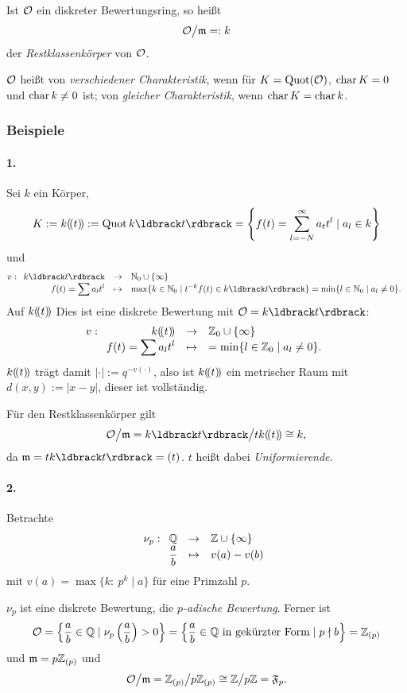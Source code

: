 \begin{definition}
	Ist $\mathcal{O}$ ein diskreter Bewertungsring, so heißt 
	\[ \mathcal{O}\big/ \mathfrak{m} =: k\]
	der \emph{Restklassenkörper} von $\mathcal{O}$.
	
	$\mathcal{O}$ heißt von \emph{verschiedener Charakteristik}, wenn
	für $K = \operatorname{Quot}(\mathcal{O})$, $\operatorname{char} K = 0$ und $\operatorname{char} k \neq 0$ ist;
	von \emph{gleicher Charakteristik}, wenn $\operatorname{char} K = \operatorname{char} k$.
\end{definition}

\subsubsection{Beispiele}

\paragraph{1.} Sei $k$ ein Körper, 
\[K := k \dr t := \Quot k \dk t = \left\{f(t) = \sum_{l=-N}^\infty a_t t^l \mid 
	a_l \in k \right\}\]
und
\[
	v: \funcdef{ k\dk t &\to& \N_0 \cup\{\infty\} \\
		f(t) = \sum a_l t^l  & \mapsto & 
			\max\{ k\in \N_0 \mid t^{-k} f(t) \in k\dk t\}
			= \min\{ l\in \N_0 \mid a_l \neq 0 \}.}
\]
Auf $k(\!( t )\!)$ Dies ist eine diskrete Bewertung mit $\O = k\dk t$:
\[
	v: \funcdef{ k\dr t &\to& \Z_0 \cup\{\infty\} \\
		f(t) = \sum a_l t^l  & \mapsto & 
			= \min\{ l\in \Z_0 \mid a_l \neq 0 \}.}
\]
$k(\!( t )\!)$ trägt damit $|\cdot | := q^{-v(\cdot)}$, also ist $k(\!( t )\!)$ ein
metrischer Raum mit $d(x,y) := |x-y|$, dieser ist vollständig.

Für den Restklassenkörper gilt
\[ \O \big/ \m = k\dk t \big/ t k \dr t \cong k, \]
da $\m = t k\dk t = (t)$. $t$ heißt dabei \emph{Uniformierende}.


\paragraph{2.}
Betrachte
\[ \nu_p: \funcdef{ \Q & \to & \Z \cup \{\infty\}\\
	\frac a b & \mapsto & v(a) - v(b)}
\]
mit $v(a) = \max\{ k:\ p^k \mid a \}$ für eine Primzahl $p$. 

$\nu_p$ ist eine diskrete Bewertung, die \emph{$p$-adische Bewertung}.
Ferner ist
\[
	\mathcal{O} = \left\{ \frac a b \in \mathbb{Q} \mid \nu_p\left(\frac a b\right) > 0
		\right\}
		=
		\left\{ \frac a b \in \mathbb{Q} \text{ in gekürzter Form} \mid 
			p\nmid b \right\}
		= \mathbb{Z}_{(p)}
\]
und $\mathfrak{m} = p \mathbb{Z}_{(p)}$ und 
\[
	\mathcal{O}\big/ \mathfrak{m} = \mathbb{Z}_{(p)} \big/ p\mathbb{Z}_{(p)} \cong
		\mathbb{Z} \big/ p\mathbb{Z} = \mathfrak F_p.
\]

